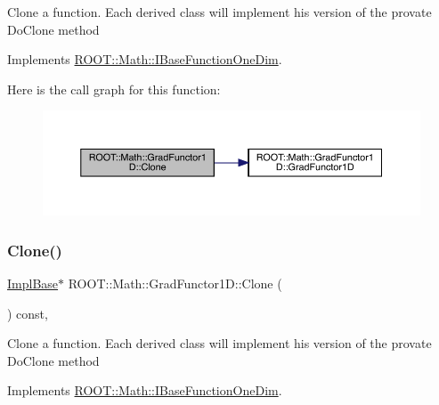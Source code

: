 Clone a function. Each derived class will implement his version of the provate Do\+Clone method 

Implements \mbox{\hyperlink{classROOT_1_1Math_1_1IBaseFunctionOneDim_a656dbb4dfc43e8d1566442bfb1a717fd}{R\+O\+O\+T\+::\+Math\+::\+I\+Base\+Function\+One\+Dim}}.

Here is the call graph for this function\+:
\nopagebreak
\begin{figure}[H]
\begin{center}
\leavevmode
\includegraphics[width=350pt]{d3/d76/classROOT_1_1Math_1_1GradFunctor1D_ab8280aaf240a374fb7a67808d858af79_cgraph}
\end{center}
\end{figure}
\mbox{\label{classROOT_1_1Math_1_1GradFunctor1D_ab8280aaf240a374fb7a67808d858af79}} 
\subsubsection{\texorpdfstring{Clone()}{Clone()}\hspace{0.1cm}{\footnotesize\ttfamily [3/3]}}
{\footnotesize\ttfamily \mbox{\hyperlink{classROOT_1_1Math_1_1GradFunctor1D_a16b436a0d100aa6c16ee66961c4f5b97}{Impl\+Base}}$\ast$ R\+O\+O\+T\+::\+Math\+::\+Grad\+Functor1\+D\+::\+Clone (\begin{DoxyParamCaption}{ }\end{DoxyParamCaption}) const\hspace{0.3cm}{\ttfamily [inline]}, {\ttfamily [virtual]}}

Clone a function. Each derived class will implement his version of the provate Do\+Clone method 

Implements \mbox{\hyperlink{classROOT_1_1Math_1_1IBaseFunctionOneDim_a656dbb4dfc43e8d1566442bfb1a717fd}{R\+O\+O\+T\+::\+Math\+::\+I\+Base\+Function\+One\+Dim}}.

